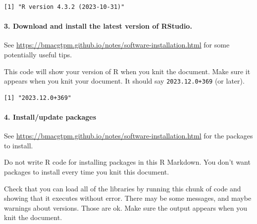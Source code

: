 \documentclass[
]{article}
\newenvironment{Shaded}{\begin{snugshade}}{\end{snugshade}}
\newcommand{\FunctionTok}[1]{\textcolor[rgb]{0.13,0.29,0.53}{\textbf{#1}}}
\newcommand{\NormalTok}[1]{#1}
\newcommand{\SpecialCharTok}[1]{\textcolor[rgb]{0.81,0.36,0.00}{\textbf{#1}}}
\begin{document}
\begin{verbatim}
[1] "R version 4.3.2 (2023-10-31)"
\end{verbatim}

\paragraph{3. Download and install the latest version of
RStudio.}\label{download-and-install-the-latest-version-of-rstudio.}

See \url{https://bmacgtpm.github.io/notes/software-installation.html}
for some potentially useful tips.

This code will show your version of R when you knit the document. Make
sure it appears when you knit your document. It should say
\texttt{2023.12.0+369} (or later).

\begin{Shaded}
\end{Shaded}

\begin{verbatim}
[1] "2023.12.0+369"
\end{verbatim}

\paragraph{4. Install/update packages}\label{installupdate-packages}

See \url{https://bmacgtpm.github.io/notes/software-installation.html}
for the packages to install.

Do not write R code for installing packages in this R Markdown. You
don't want packages to install every time you knit this document.

Check that you can load all of the libraries by running this chunk of
code and showing that it executes without error. There may be some
messages, and maybe warnings about versions. Those are ok. Make sure the
output appears when you knit the document.
\end{document}
